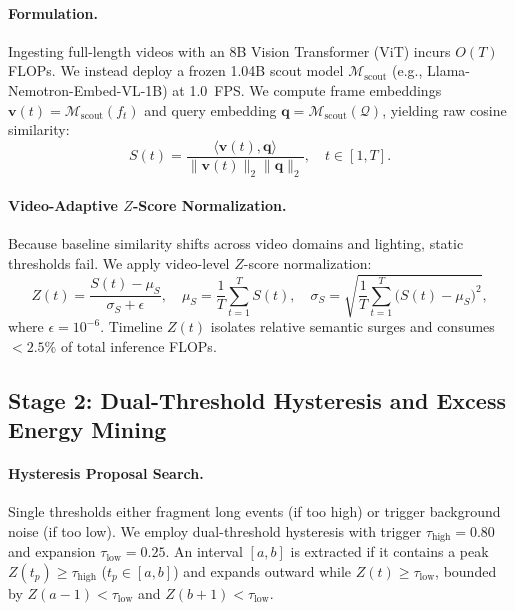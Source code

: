 \paragraph{Formulation.} Ingesting full-length videos with an 8B Vision Transformer (ViT) incurs $O(T)$ FLOPs. We instead deploy a frozen 1.04B scout model $\mathcal{M}_{\text{scout}}$ (e.g., Llama-Nemotron-Embed-VL-1B) at 1.0~FPS. We compute frame embeddings $\mathbf{v}(t) = \mathcal{M}_{\text{scout}}(f_t)$ and query embedding $\mathbf{q} = \mathcal{M}_{\text{scout}}(\mathcal{Q})$, yielding raw cosine similarity:
\begin{equation}
    S(t) = \frac{\langle \mathbf{v}(t), \mathbf{q} \rangle}{\|\mathbf{v}(t)\|_2 \|\mathbf{q}\|_2}, \quad t \in [1, T].
    \label{eq:cosine_sim}
\end{equation}

\paragraph{Video-Adaptive $Z$-Score Normalization.} Because baseline similarity shifts across video domains and lighting, static thresholds fail. We apply video-level $Z$-score normalization:
\begin{equation}
    Z(t) = \frac{S(t) - \mu_S}{\sigma_S + \epsilon}, \quad \mu_S = \frac{1}{T}\sum_{t=1}^T S(t), \quad \sigma_S = \sqrt{\frac{1}{T}\sum_{t=1}^T \big(S(t) - \mu_S\big)^2},
    \label{eq:z_score}
\end{equation}
where $\epsilon = 10^{-6}$. Timeline $Z(t)$ isolates relative semantic surges and consumes $<2.5\%$ of total inference FLOPs.


\subsection{Stage 2: Dual-Threshold Hysteresis and Excess Energy Mining}
\label{sec:stage2}

\paragraph{Hysteresis Proposal Search.} Single thresholds either fragment long events (if too high) or trigger background noise (if too low). We employ dual-threshold hysteresis with trigger $\tau_{\text{high}} = 0.80$ and expansion $\tau_{\text{low}} = 0.25$. An interval $[a, b]$ is extracted if it contains a peak $Z(t_p) \ge \tau_{\text{high}}$ ($t_p \in [a, b]$) and expands outward while $Z(t) \ge \tau_{\text{low}}$, bounded by $Z(a-1) < \tau_{\text{low}}$ and $Z(b+1) < \tau_{\text{low}}$.

